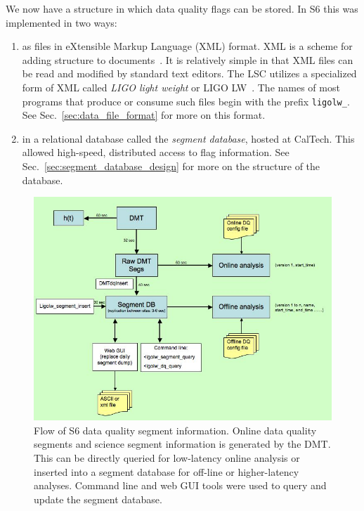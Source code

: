 We now have a structure in which data quality flags can be stored.
In S6 this was implemented in two ways:
%
\begin{enumerate}
\item as files in eXtensible Markup Language (XML) format.  XML is a
scheme for adding structure to documents~\cite{xmlconsortium}.  It is
relatively simple in that XML files can be read and modified by
standard text editors.  The LSC utilizes a specialized form of XML
called \emph{LIGO light weight} or LIGO LW~\cite{LIGO-T990023-01}.
The names of most programs that produce or consume such files begin
with the prefix \texttt{ligolw\_}.  See
Sec.~\ref{sec:data_file_format} for more on this format.

\item in a relational database called the \emph{segment database},
hosted at CalTech.  This allowed high-speed, distributed
access to flag information.  See
Sec.~\ref{sec:segment_database_design} for more on the structure of
the database.
\end{enumerate}


\begin{figure}[h]
  \label{f:segment_flow}
  \includegraphics[width=\linewidth]{figures/segdb/T0900005_fig1}
  \caption[Flow of S6 data quality information]{
  Flow of S6 data quality segment information. Online data
  quality segments and science segment information is generated by the DMT.
  This can be directly queried for low-latency online analysis or inserted
  into a segment database for off-line or higher-latency analyses. Command
  line and web GUI tools were used to query and update the segment
  database.} 
\end{figure}

